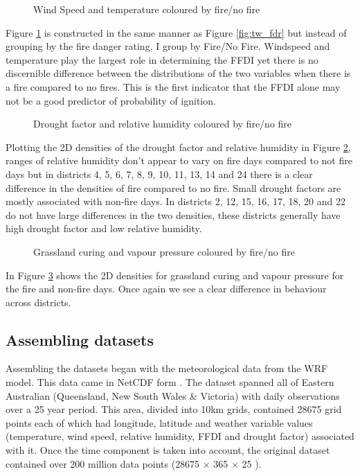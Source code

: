\documentclass[11pt,a4paper]{article}
\begin{document}
\begin{figure}[!ht]
	\centering 
	\caption{Wind Speed and temperature coloured by fire/no fire} 
	\label{fig:tw_fire} 
\end{figure}

Figure \ref{fig:tw_fire} is constructed in the same manner as Figure \ref{fig:tw_fdr} but instead of grouping by the fire danger rating, I group by Fire/No Fire. Windspeed and temperature play the largest role in determining the FFDI yet there is no discernible difference between the distributions of the two variables when there is a fire compared to no fires. This is the first indicator that the FFDI alone may not be a good predictor of probability of ignition. 

\begin{figure}[!ht]
	\centering 
	\caption{Drought factor and relative humidity coloured by fire/no fire} 
	\label{fig:dh_fire} 
\end{figure}

Plotting the 2D densities of the drought factor and relative humidity in Figure \ref{fig:dh_fire}, ranges of relative humidity don't appear to vary on fire days compared to not fire days but in districts 4, 5, 6, 7, 8, 9, 10, 11, 13, 14 and 24 there is a clear difference in the densities of fire compared to no fire. Small drought factors are mostly associated with non-fire days. In districts 2, 12, 15, 16, 17, 18, 20 and 22 do not have large differences in the two densities, these districts generally have high drought factor and low relative humidity. 

\begin{figure}[!ht]
	\centering 
	\caption{Grassland curing and vapour pressure coloured by fire/no fire} 
	\label{fig:gv_fire} 
\end{figure}

In Figure \ref{fig:gv_fire} shows the 2D densities for grassland curing and vapour pressure for the fire and non-fire days. Once again we see a clear difference in behaviour across districts.  

\subsection{Assembling datasets}

Assembling the datasets began with the meteorological data from the WRF model. This data came in NetCDF form \citep{ncdf}. The dataset spanned all of Eastern Australian (Queensland, New South Wales \& Victoria) with daily observations over a 25 year period. This area, divided into 10km grids, contained 28675 grid points each of which had longitude, latitude and weather variable values (temperature, wind speed, relative humidity, FFDI and drought factor) associated with it. Once the time component is taken into account, the original dataset contained over 200 million data points (28675 $\times$ 365 $\times$ 25 ). 
\end{document}
